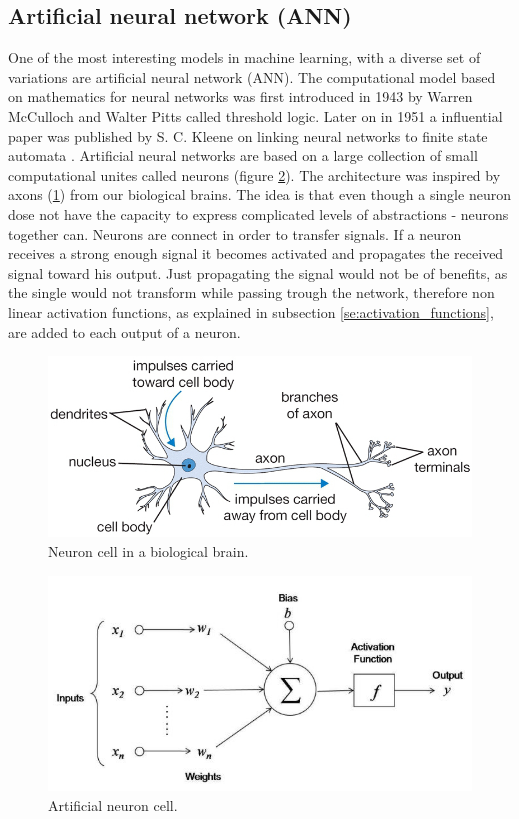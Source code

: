 \documentclass[times, utf8, diplomski]{fer}
\begin{document}
\subsection{Artificial neural network (ANN)}
One of the most interesting models in machine learning, with a diverse set of variations are artificial neural network (ANN). The computational model based on mathematics for neural networks was first introduced in 1943 by Warren McCulloch and Walter Pitts \citep{mcculloch_logical_1943}  called threshold logic. Later on in 1951 a influential paper was published by S. C. Kleene on linking neural networks to finite state automata \citep{kleene_representation_1951}. Artificial neural networks are based on a large collection of small computational unites called neurons (figure  \ref{fig:ann_neuron}). The architecture was inspired by axons (\ref{fig:neuron}) from our biological brains. The idea is that even though a single neuron dose not have the capacity to express complicated levels of abstractions - neurons together can. Neurons are connect in order to transfer signals. If a neuron receives a strong enough signal it becomes activated and propagates the received signal toward his output. Just propagating the signal would not be of benefits, as the single would not transform while passing trough the network, therefore non linear activation functions, as explained in subsection \ref{se:activation_functions}, are added to each output of a neuron.

\begin{figure}
  \includegraphics[width=\linewidth]{figures/axon.png}
  \caption{Neuron cell in a biological brain.}
  \label{fig:neuron}
\end{figure}

\begin{figure}
  \includegraphics[width=\linewidth]{figures/neuron.jpg}
  \caption{Artificial neuron cell.}
  \label{fig:ann_neuron}
\end{figure}
\end{document}
